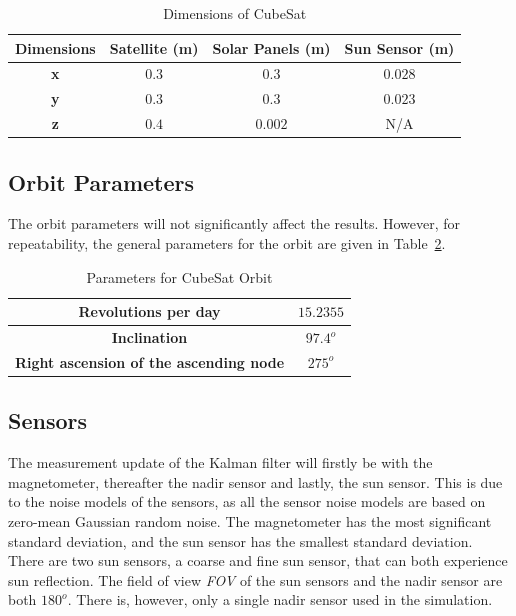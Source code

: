 \documentclass[letterpaper, 10 pt, conference]{ieeeconf}  %
\begin{document}
\begin{table}[!htb]
	\caption{\label{Table:Dimensions}Dimensions of CubeSat}
	\begin{tabular}{|c|c|c|c|}
		\hline
		\textbf{Dimensions} & \textbf{Satellite (m)} & \textbf{Solar Panels (m)} & \textbf{Sun Sensor (m)} \\ \hline
		\textbf{x}          & $0.3$                    & $0.3$                       & $0.028$                   \\ \hline
		\textbf{y}          & $0.3$                    & $0.3$                       & $0.023$                   \\ \hline
		\textbf{z}          & $0.4$                    & $0.002$                     & N/A                     \\ \hline
	\end{tabular}
\end{table}


\subsection{Orbit Parameters}
The orbit parameters will not significantly affect the results. However, for repeatability, the general parameters for the orbit are given in Table~\ref{Table:OrbitParameters}. 

\begin{table}[!htb]
	\caption{\label{Table:OrbitParameters}Parameters for CubeSat Orbit}
	\begin{tabular}{|c|c|}
		\hline
		\textbf{Revolutions per day}          & $15.2355$                    \\ \hline
		\textbf{Inclination}          & $97.4^o$                    \\ \hline
		\textbf{Right ascension of the ascending node} & $275^o$ \\ \hline
	\end{tabular}
\end{table}

\subsection{Sensors}
The measurement update of the Kalman filter will firstly be with the magnetometer, thereafter the nadir sensor and lastly, the sun sensor. This is due to the noise models of the sensors, as all the sensor noise models are based on zero-mean Gaussian random noise. The magnetometer has the most significant standard deviation, and the sun sensor has the smallest standard deviation. There are two sun sensors, a coarse and fine sun sensor, that can both experience sun reflection. The field of view \emph{FOV} of the sun sensors and the nadir sensor are both $180^o$. There is, however, only a single nadir sensor used in the simulation.
\end{document}
